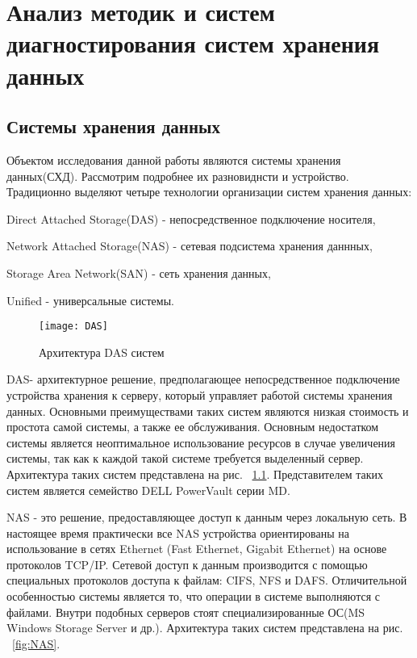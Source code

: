 \chapter{Анализ методик и систем диагностирования систем хранения данных}
\section{Системы хранения данных}
Объектом исследования данной работы являются системы хранения данных(СХД). Рассмотрим подробнее их разновиднсти и устройство. 
Традиционно выделяют четыре технологии организации систем хранения данных: 
\begin{itemize*}
	\item{Direct Attached Storage(DAS) - непосредственное подключение носителя,}
	\item{Network Attached Storage(NAS) - сетевая подсистема хранения даннных,}
	\item{Storage Area Network(SAN) - сеть хранения данных,}
	\item{Unified - универсальные системы.}
\end{itemize*}

\begin{figure}[!h]
	\centering
	\texttt{[image: DAS]}
	\caption{Архитектура DAS систем}
	\label{fig:DAS}
\end{figure}

DAS- архитектурное решение, предполагающее непосредственное подключение устройства хранения к серверу, который управляет работой системы хранения данных. Основными преимуществами таких систем являются низкая стоимость и простота самой системы, а также ее обслуживания. Основным недостатком системы является неоптимальное использование ресурсов в случае увеличения системы, так как к каждой такой системе требуется выделенный сервер. Архитектура таких систем представлена на рис. ~\ref{fig:DAS}. Представителем таких систем является семейство DELL PowerVault серии MD.

NAS - это решение, предоставляющее доступ к данным через локальную сеть. В настоящее время практически все NAS устройства ориентированы на использование в сетях Ethernet (Fast Ethernet, Gigabit Ethernet) на основе протоколов TCP/IP. Сетевой доступ к данным производится с помощью специальных протоколов доступа к файлам: CIFS, NFS и DAFS. Отличительной особенностью системы является то, что операции в системе выполняются с файлами. Внутри подобных серверов стоят специализированные ОС(MS Windows Storage Server и др.). Архитектура таких систем представлена на рис. ~\ref{fig:NAS}.


